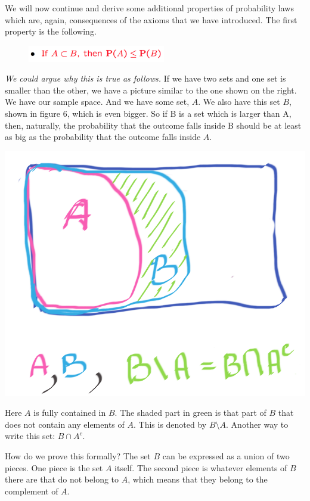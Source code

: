\documentclass{tufte-handout}
\begin{document}
 We will now continue and derive some additional properties of probability laws which are, again,
consequences of the axioms that we have introduced. The first property is the following.

\begin{figure}[h]
  \includegraphics[width=6cm]{Conseq1}
\end{figure}



\textit{We could argue why this is true as follows.} If we have two
sets and one set is smaller than the other, we have a picture similar to the one shown on the right. We have our sample
space. And we have some set, $A$.
We also have this set $B$, shown in figure 6, which is even bigger. So if B is a
set which is larger than A, then, naturally, the probability that the outcome falls inside B should be at
least as big as the probability that the outcome falls inside $A$.

\begin{marginfigure}
  \includegraphics{AinB}
  \caption{Here $A$ is fully contained in $B$. The shaded part in green is that part of $B$ that does not contain any elements of $A$. This is denoted by $B \setminus A$. Another way to write this set: $B \cap A^c$.}
\end{marginfigure}

How do we prove this formally? The set $B$ can be expressed as a union of two pieces. One piece is the
set $A$ itself. The second piece is whatever elements of $B$ there are that do not belong to $A$, which means that
they belong to the complement of $A$.
\end{document}

